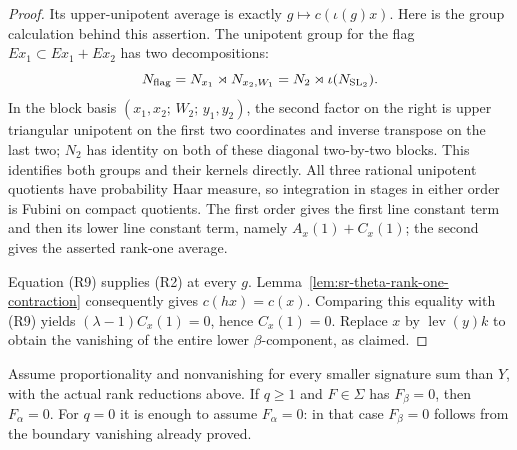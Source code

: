 \begin{proof}
Its upper-unipotent average is exactly \(g\mapsto c(\iota(g)x)\).
Here is the group calculation behind this assertion.
The unipotent group for the flag \(E x_1\subset E x_1+E x_2\)
has two decompositions:
\[
 N_{\rm flag}=N_{x_1}\rtimes N_{x_2,W_1}
             =N_2\rtimes\iota(N_{\mathrm{SL}_2}).
\]
In the block basis
\((x_1,x_2;\,W_2;\,y_1,y_2)\), the second factor on the right
is upper triangular unipotent on the first two coordinates
and inverse transpose on the last two; \(N_2\) has identity
on both of these diagonal two-by-two blocks.
This identifies both groups and their kernels directly.
All three rational unipotent quotients have probability Haar
measure, so integration in stages in either order is Fubini
on compact quotients. The first order gives the first line
constant term and then its lower line constant term,
namely \(A_x(1)+C_x(1)\); the second gives the asserted
rank-one average.

Equation (R9) supplies (R2) at every \(g\).
Lemma~\ref{lem:sr-theta-rank-one-contraction} consequently gives
\(c(hx)=c(x)\). Comparing this equality with (R9) yields
\((\lambda-1)C_x(1)=0\), hence \(C_x(1)=0\).
Replace \(x\) by \(\operatorname{lev}(y)k\) to obtain
the vanishing of the entire lower \(\beta\)-component, as claimed.
\end{proof}

\begin{srproposition}
\label{prop:sr-theta-two-step-zero}
Assume proportionality and nonvanishing for every smaller
signature sum than \(Y\), with the actual rank reductions above.
If \(q\ge1\) and \(F\in\Sigma\) has \(F_\beta=0\), then
\(F_\alpha=0\).
For \(q=0\) it is enough to assume \(F_\alpha=0\):
in that case \(F_\beta=0\) follows from the boundary vanishing
already proved.
\end{srproposition}

